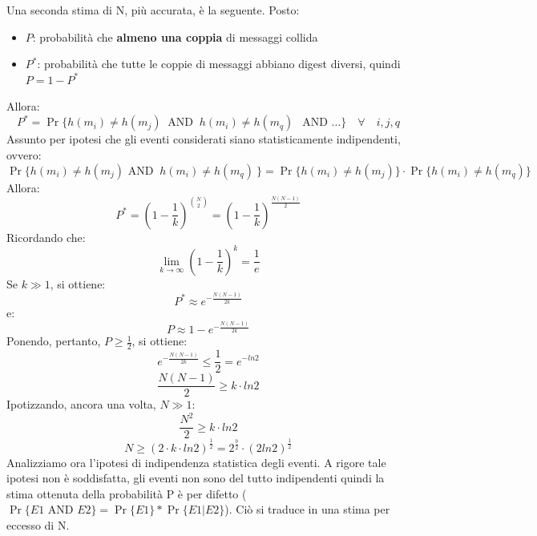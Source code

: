 Una seconda stima di N, più accurata, è la seguente. Posto:
\begin{itemize}
\item $P$: probabilità che \textbf{almeno una coppia} di messaggi collida
\item $P^{*}$: probabilità che tutte le coppie di messaggi abbiano digest diversi, quindi $P = 1 - P^{*}$
\end{itemize}
Allora:
\begin{equation}
P^{*} = \Pr\{h(m_i) \neq h(m_j) \: \mbox{ AND } \: h(m_i) \neq h(m_q)\ \: \mbox{ AND } ... \}  \quad \forall \quad i,j,q
\end{equation}
Assunto per ipotesi che gli eventi considerati siano statisticamente indipendenti, ovvero:
\begin{equation}
\Pr\{h(m_i) \neq h(m_j) \mbox{ AND } \: h(m_i) \neq h(m_q)\ \} = \Pr\{h(m_i) \neq h(m_j)\} \cdot \Pr\{h(m_i) \neq h(m_q)\}
\end{equation}
Allora:
\begin{equation}
P^{*} = (1 - \frac{1}{k})^{\binom {N}{2}} = (1 - \frac{1}{k})^{\frac{N(N-1)}{2}}
\end{equation}
Ricordando che:
\begin{equation}
 \lim_{k\to \infty}{(1 - \frac{1}{k})^k} = \frac{1}{e} 
\end{equation}
Se $k \gg 1$, si ottiene:
\begin{equation}
P^{*} \approx e^{-\frac{N(N-1)}{2k}}
\end{equation}
e:
\begin{equation}
P \approx 1 - e^{-\frac{N(N-1)}{2k}}
\end{equation}
Ponendo, pertanto, $P \geq \frac{1}{2}$, si ottiene:
\begin{equation}
e^{-\frac{N(N-1)}{2k}} \leq \frac{1}{2} = e^{-ln2}
\end{equation}
\begin{equation}
\frac{N(N-1)}{2} \geq k \cdot ln2
\end{equation}
Ipotizzando, ancora una volta, $N \gg 1$:
\begin{equation}
\frac{N^2}{2} \geq k \cdot ln2 
\end{equation}
\begin{equation}
N \geq (2 \cdot k \cdot ln2)^{\frac{1}{2}} = 2^{\frac{b}{2}} \cdot (2ln2)^{\frac{1}{2}}
\end{equation}
Analizziamo ora l'ipotesi di indipendenza statistica degli eventi. A rigore tale ipotesi non è soddisfatta, gli eventi non sono del tutto indipendenti quindi la stima ottenuta della probabilità P è per difetto ($\Pr\{E1 \mbox{ AND } E2\} = \Pr\{E1\} * \Pr\{E1|E2\}$). Ciò si traduce in una stima per eccesso di N. 

